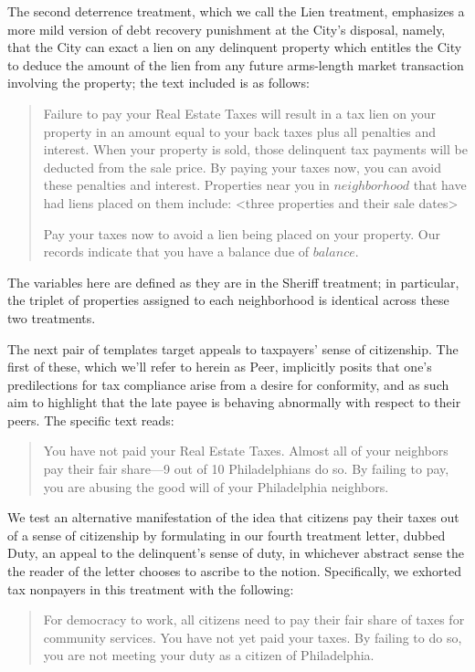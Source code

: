 \documentclass[12pt,titlepage]{article}
\begin{document}
The second deterrence treatment, which we call the Lien treatment, emphasizes 
a more mild version of debt recovery punishment at the City's disposal, 
namely, that the City can exact a lien on any delinquent property which 
entitles the City to deduce the amount of the lien from any future arms-length 
market transaction involving the property; the text included is as follows: 

\blockquote{
	Failure to pay your Real Estate Taxes will result in a tax lien on your 
	property in an amount equal to your back taxes plus all penalties and 
	interest. When your property is sold, those delinquent tax payments will 
	be deducted from the sale price. By paying your taxes now, you can avoid 
	these penalties and interest. Properties near you in $neighborhood$ that 
	have had liens placed on them include: 
	<three properties and their sale dates> 

	Pay your taxes now to avoid a lien being placed on your property. 
	Our records indicate that you have a balance due of $balance$.
}



The variables here are defined as they are in the Sheriff treatment; 
in particular, the triplet of properties assigned to each neighborhood is 
identical across these two treatments. 

The next pair of templates target appeals to taxpayers' sense of citizenship. 
The first of these, which we'll refer to herein as Peer, implicitly posits 
that one's predilections for tax compliance arise from a desire for conformity, 
and as such aim to highlight that the late payee is behaving abnormally with 
respect to their peers. The specific text reads:

\blockquote{
	
	You have not paid your Real Estate Taxes. Almost all of your neighbors 
	pay their fair share—9 out of 10 Philadelphians do so. By failing to pay, 
	you are abusing the good will of your Philadelphia neighbors.
}
 
We test an alternative manifestation of the idea that citizens pay their 
taxes out of a sense of citizenship by formulating in our fourth treatment 
letter, dubbed Duty, an appeal to the delinquent’s sense of duty, in whichever 
abstract sense the the reader of the letter chooses to ascribe to the notion. 
Specifically, we exhorted tax nonpayers in this treatment with the following:

\blockquote{
	For democracy to work, all citizens need to pay their fair share of taxes 
	for community services. You have not yet paid your taxes. By failing to 
	do so, you are not meeting your duty as a citizen of Philadelphia.
}
\end{document}
